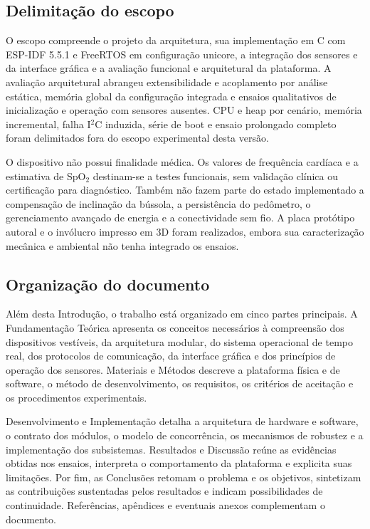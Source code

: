 \documentclass[a4paper,12pt]{article}
\begin{document}
\subsection{Delimita\c{c}\~ao do escopo}

O escopo compreende o projeto da arquitetura, sua implementa\c{c}\~ao em C com ESP-IDF 5.5.1 e FreeRTOS em configura\c{c}\~ao unicore, a integra\c{c}\~ao dos sensores e da interface gr\'afica e a avalia\c{c}\~ao funcional e arquitetural da plataforma. A avalia\c{c}\~ao arquitetural abrangeu extensibilidade e acoplamento por an\'alise est\'atica, mem\'oria global da configura\c{c}\~ao integrada e ensaios qualitativos de inicializa\c{c}\~ao e opera\c{c}\~ao com sensores ausentes. CPU e heap por cen\'ario, mem\'oria incremental, falha I$^2$C induzida, s\'erie de boot e ensaio prolongado completo foram delimitados fora do escopo experimental desta vers\~ao.

O dispositivo n\~ao possui finalidade m\'edica. Os valores de frequ\^encia card\'iaca e a estimativa de SpO$_2$ destinam-se a testes funcionais, sem valida\c{c}\~ao cl\'inica ou certifica\c{c}\~ao para diagn\'ostico. Tamb\'em n\~ao fazem parte do estado implementado a compensa\c{c}\~ao de inclina\c{c}\~ao da b\'ussola, a persist\^encia do ped\^ometro, o gerenciamento avan\c{c}ado de energia e a conectividade sem fio. A placa prot\'otipo autoral e o inv\'olucro impresso em 3D foram realizados, embora sua caracteriza\c{c}\~ao mec\^anica e ambiental n\~ao tenha integrado os ensaios.

\subsection{Organiza\c{c}\~ao do documento}

Al\'em desta Introdu\c{c}\~ao, o trabalho est\'a organizado em cinco partes principais. A Fundamenta\c{c}\~ao Te\'orica apresenta os conceitos necess\'arios \`a compreens\~ao dos dispositivos vest\'iveis, da arquitetura modular, do sistema operacional de tempo real, dos protocolos de comunica\c{c}\~ao, da interface gr\'afica e dos princ\'ipios de opera\c{c}\~ao dos sensores. Materiais e M\'etodos descreve a plataforma f\'isica e de software, o m\'etodo de desenvolvimento, os requisitos, os crit\'erios de aceita\c{c}\~ao e os procedimentos experimentais.

Desenvolvimento e Implementa\c{c}\~ao detalha a arquitetura de hardware e software, o contrato dos m\'odulos, o modelo de concorr\^encia, os mecanismos de robustez e a implementa\c{c}\~ao dos subsistemas. Resultados e Discuss\~ao re\'une as evid\^encias obtidas nos ensaios, interpreta o comportamento da plataforma e explicita suas limita\c{c}\~oes. Por fim, as Conclus\~oes retomam o problema e os objetivos, sintetizam as contribui\c{c}\~oes sustentadas pelos resultados e indicam possibilidades de continuidade. Refer\^encias, ap\^endices e eventuais anexos complementam o documento.
\end{document}
